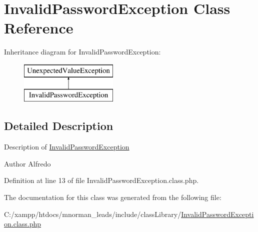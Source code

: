 \hypertarget{class_invalid_password_exception}{\section{Invalid\-Password\-Exception Class Reference}
\label{class_invalid_password_exception}
}
Inheritance diagram for Invalid\-Password\-Exception\-:\begin{figure}[H]
\begin{center}
\leavevmode
\includegraphics[height=2.000000cm]{class_invalid_password_exception}
\end{center}
\end{figure}


\subsection{Detailed Description}
Description of \hyperlink{class_invalid_password_exception}{Invalid\-Password\-Exception}

\begin{DoxyAuthor}{Author}
Alfredo 
\end{DoxyAuthor}


Definition at line 13 of file Invalid\-Password\-Exception.\-class.\-php.



The documentation for this class was generated from the following file\-:\begin{DoxyCompactItemize}
\item 
C\-:/xampp/htdocs/mnorman\-\_\-leads/include/class\-Library/\hyperlink{_invalid_password_exception_8class_8php}{Invalid\-Password\-Exception.\-class.\-php}\end{DoxyCompactItemize}

